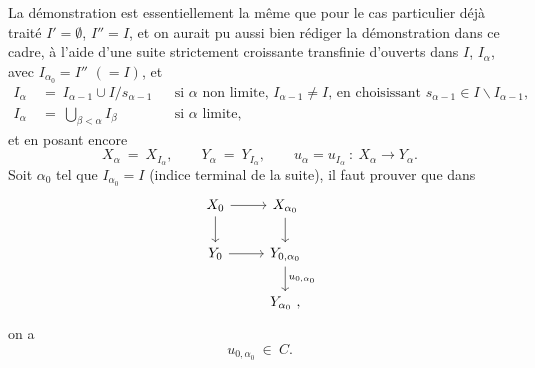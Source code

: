 La démonstration est essentiellement la même que pour le cas particulier déjà traité $I' = \emptyset$, $I'' = I$, et on aurait pu aussi bien rédiger la démonstration dans ce cadre, à l'aide d'une suite strictement croissante transfinie d'ouverts dans $I$, $I_\alpha$, avec  $I_{\alpha_0} = I''$ $(= I)$, et
\[
\begin{aligned}
I_\alpha \ &= \ I_{\alpha-1} \cup I/s_{\alpha-1} && \text{si $\alpha$ non limite, $I_{\alpha-1} \neq I$, en choisissant $s_{\alpha-1} \in I \backslash I_{\alpha-1}$,} \\
I_\alpha \ &= \ \textstyle\bigcup_{\beta<\alpha} I_\beta && \text{si $\alpha$ limite,}
\end{aligned}
\]
et en posant encore
\[
X_\alpha \ = \ X_{I_\alpha}, \qquad Y_\alpha \ = \ Y_{I_\alpha}, \qquad u_\alpha = u_{I_\alpha} \ : \ X_\alpha \longrightarrow Y_\alpha.
\]
Soit $\alpha_0$ tel que $I_{\alpha_0} = I$ (indice terminal de la suite), il faut prouver que dans
\[
\begin{tikzcd}
X_0 \arrow[r] \arrow[d] & X_{\alpha_0} \arrow[d] \\
Y_0 \arrow[r] & Y_{0,\alpha_0} \arrow[d, "u_{0,\alpha_0}"] \\
 & Y_{\alpha_0}\ ,
\end{tikzcd}
\]
 on a
\[
u_{0,\alpha_0} \ \in \ C.
\]

